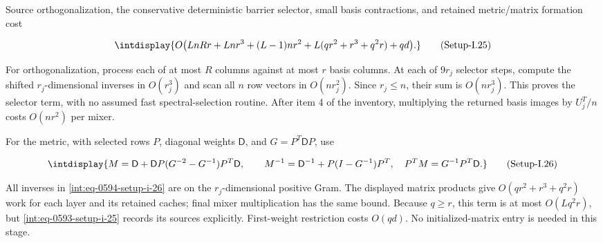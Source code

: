
Source orthogonalization, the conservative deterministic barrier selector, small basis contractions, and retained metric/matrix formation cost


\label{int:eq-setup-i-25}
\begingroup\renewcommand{\theHequation}{intdisplay.1109}
\begin{equation}
\intdisplay{
O\bigl(LnRr+Lnr^3+(L-1)nr^2
       +L(qr^2+r^3+q^2r)+qd\bigr).
}
\tag{Setup-I.25}
\label{int:eq-0593-setup-i-25}
\end{equation}
\endgroup


For orthogonalization, process each of at most \(R\) columns against at most \(r\) basis columns. At each of \(9r_j\) selector steps, compute the shifted \(r_j\)-dimensional inverses in \(O(r_j^3)\) and scan all \(n\) row vectors in \(O(nr_j^2)\). Since \(r_j\le n\), their sum is \(O(nr_j^3)\). This proves the selector term, with no assumed fast spectral-selection routine. After item 4 of the inventory, multiplying the returned basis images by \(U_j^T/n\) costs \(O(nr^2)\) per mixer.



For the metric, with selected rows \(P\), diagonal weights \(\mathsf D\), and \(G=P^T\mathsf DP\), use


\label{int:eq-setup-i-26}
\begingroup\renewcommand{\theHequation}{intdisplay.1110}
\begin{equation}
\intdisplay{
M=\mathsf D+\mathsf DP(G^{-2}-G^{-1})P^T\mathsf D,\qquad
M^{-1}=\mathsf D^{-1}+P(I-G^{-1})P^T,
\quad P^TM=G^{-1}P^T\mathsf D.
}
\tag{Setup-I.26}
\label{int:eq-0594-setup-i-26}
\end{equation}
\endgroup


All inverses in \hyperref[int:eq-setup-i-26]{\eqref{int:eq-0594-setup-i-26}} are on the \(r_j\)-dimensional positive Gram. The displayed matrix products give \(O(qr^2+r^3+q^2r)\) work for each layer and its retained caches; final mixer multiplication has the same bound. Because \(q\ge r\), this term is at most \(O(Lq^2r)\), but \hyperref[int:eq-setup-i-25]{\eqref{int:eq-0593-setup-i-25}} records its sources explicitly. First-weight restriction costs \(O(qd)\). No initialized-matrix entry is needed in this stage.


